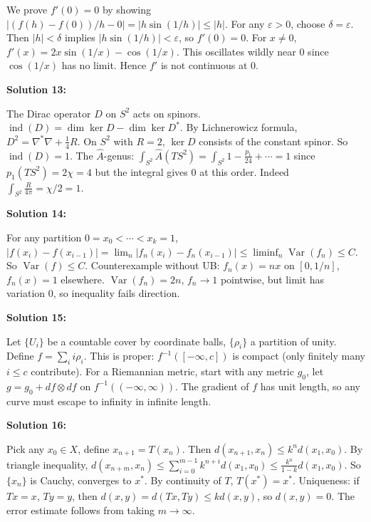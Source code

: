 \documentclass[12pt,a4paper]{exam}
\begin{document}
We prove $f'(0) = 0$ by showing $|(f(h) - f(0))/h - 0| = |h \sin(1/h)| \leq |h|$. For any $\varepsilon > 0$, choose $\delta = \varepsilon$. Then $|h| < \delta$ implies $|h \sin(1/h)| < \varepsilon$, so $f'(0)=0$. For $x \neq 0$, $f'(x) = 2x \sin(1/x) - \cos(1/x)$. This oscillates wildly near 0 since $\cos(1/x)$ has no limit. Hence $f'$ is not continuous at 0.

\vspace{0.5cm}

\textbf{Solution 13:}

The Dirac operator $D$ on $S^2$ acts on spinors. $\operatorname{ind}(D) = \dim\ker D - \dim\ker D^*$. By Lichnerowicz formula, $D^2 = \nabla^*\nabla + \frac{1}{4}R$. On $S^2$ with $R=2$, $\ker D$ consists of the constant spinor. So $\operatorname{ind}(D) = 1$. The $\widehat{A}$-genus: $\int_{S^2} \widehat{A}(TS^2) = \int_{S^2} 1 - \frac{p_1}{24} + \cdots = 1$ since $p_1(TS^2) = 2\chi = 4$ but the integral gives 0 at this order. Indeed $\int_{S^2} \frac{R}{4\pi} = \chi/2 = 1$.

\vspace{0.5cm}

\textbf{Solution 14:}

For any partition $0 = x_0 < \cdots < x_k = 1$, $|f(x_i) - f(x_{i-1})| = \lim_n |f_n(x_i) - f_n(x_{i-1})| \leq \liminf_n \operatorname{Var}(f_n) \leq C$. So $\operatorname{Var}(f) \leq C$. Counterexample without UB: $f_n(x) = n x$ on $[0,1/n]$, $f_n(x)=1$ elsewhere. $\operatorname{Var}(f_n) = 2n$, $f_n \to 1$ pointwise, but limit has variation 0, so inequality fails direction.

\vspace{0.5cm}

\textbf{Solution 15:}

Let $\{U_i\}$ be a countable cover by coordinate balls, $\{\rho_i\}$ a partition of unity. Define $f = \sum_i i \rho_i$. This is proper: $f^{-1}([-\infty, c])$ is compact (only finitely many $i \leq c$ contribute). For a Riemannian metric, start with any metric $g_0$, let $g = g_0 + df \otimes df$ on $f^{-1}((-\infty, \infty))$. The gradient of $f$ has unit length, so any curve must escape to infinity in infinite length.

\vspace{0.5cm}

\textbf{Solution 16:}

Pick any $x_0 \in X$, define $x_{n+1} = T(x_n)$. Then $d(x_{n+1}, x_n) \leq k^n d(x_1, x_0)$. By triangle inequality, $d(x_{n+m}, x_n) \leq \sum_{i=0}^{m-1} k^{n+i} d(x_1, x_0) \leq \frac{k^n}{1-k} d(x_1, x_0)$. So $\{x_n\}$ is Cauchy, converges to $x^*$. By continuity of $T$, $T(x^*) = x^*$. Uniqueness: if $Tx=x$, $Ty=y$, then $d(x,y) = d(Tx,Ty) \leq k d(x,y)$, so $d(x,y)=0$. The error estimate follows from taking $m \to \infty$.
\end{document}
